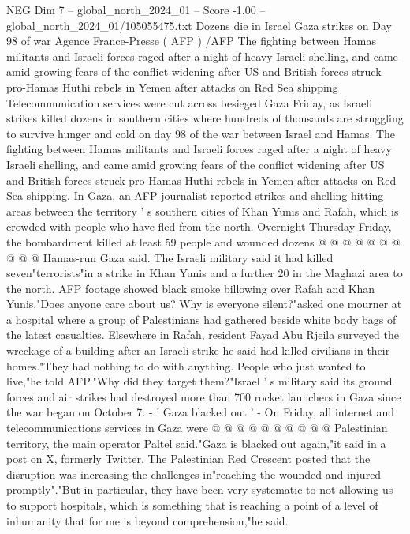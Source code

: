 \begin{textsample}{NEG Dim 7 – global\_north\_2024\_01 – Score -1.00 – global\_north\_2024\_01/105055475.txt}  \label{ex:f7_neg_265}
Dozens die in Israel Gaza strikes on Day 98 of war Agence France-Presse ( AFP ) /AFP The fighting between Hamas militants and Israeli forces raged after a night of heavy Israeli shelling, and came amid growing fears of the conflict widening after US and British forces struck pro-Hamas Huthi rebels in Yemen after attacks on Red Sea shipping Telecommunication services were cut across besieged Gaza Friday, as Israeli strikes killed dozens in southern cities where hundreds of thousands are struggling to survive hunger and cold on day 98 of the war between Israel and Hamas.
The fighting between Hamas militants and Israeli forces raged after a night of heavy Israeli shelling, and came amid growing fears of the conflict widening after US and British forces struck pro-Hamas Huthi rebels in Yemen after attacks on Red Sea shipping.
In Gaza, an AFP journalist reported strikes and shelling hitting areas between the territory ' s southern cities of Khan Yunis and Rafah, which is crowded with people who have fled from the north.
Overnight Thursday-Friday, the bombardment killed at least 59 people and wounded dozens @ @ @ @ @ @ @ @ @ @ Hamas-run Gaza said.
The Israeli military said it had killed seven"terrorists"in a strike in Khan Yunis and a further 20 in the Maghazi area to the north.
AFP footage showed black smoke billowing over Rafah and Khan Yunis."Does anyone care about us?
Why is everyone silent?"asked one mourner at a hospital where a group of Palestinians had gathered beside white body bags of the latest casualties.
Elsewhere in Rafah, resident Fayad Abu Rjeila surveyed the wreckage of a building after an Israeli strike he said had killed civilians in their homes."They had nothing to do with anything.
People who just wanted to live,"he told AFP."Why did they target them?"Israel ' s military said its ground forces and air strikes had destroyed more than 700 rocket launchers in Gaza since the war began on October 7. - ' Gaza blacked out ' - On Friday, all internet and telecommunications services in Gaza were @ @ @ @ @ @ @ @ @ @ Palestinian territory, the main operator Paltel said."Gaza is blacked out again,"it said in a post on X, formerly Twitter.
The Palestinian Red Crescent posted that the disruption was increasing the challenges in"reaching the wounded and injured promptly"."But in particular, they have been very systematic to not allowing us to support hospitals, which is something that is reaching a point of a level of inhumanity that for me is beyond comprehension,"he said.

\end{textsample}
